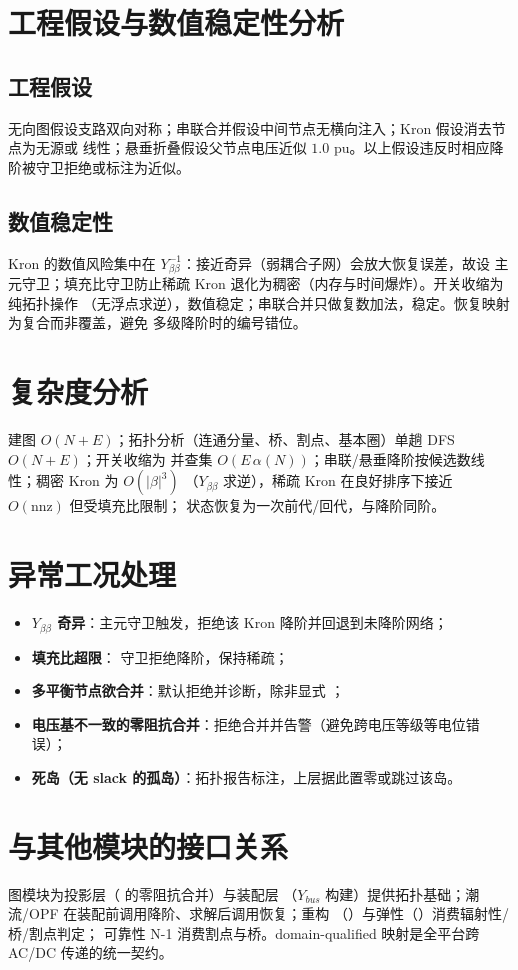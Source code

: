 \documentclass[UTF8,fontset=fandol,a4paper,11pt]{ctexart}
\begin{document}
\section{工程假设与数值稳定性分析}
\subsection{工程假设}
无向图假设支路双向对称；串联合并假设中间节点无横向注入；Kron 假设消去节点为无源或
线性；悬垂折叠假设父节点电压近似 $1.0$ pu。以上假设违反时相应降阶被守卫拒绝或标注为近似。

\subsection{数值稳定性}
Kron 的数值风险集中在 $Y_{\beta\beta}^{-1}$：接近奇异（弱耦合子网）会放大恢复误差，故设
主元守卫；填充比守卫防止稀疏 Kron 退化为稠密（内存与时间爆炸）。开关收缩为纯拓扑操作
（无浮点求逆），数值稳定；串联合并只做复数加法，稳定。恢复映射为复合而非覆盖，避免
多级降阶时的编号错位。

\section{复杂度分析}
建图 $O(N+E)$；拓扑分析（连通分量、桥、割点、基本圈）单趟 DFS $O(N+E)$；开关收缩为
并查集 $O(E\,\alpha(N))$；串联/悬垂降阶按候选数线性；稠密 Kron 为 $O(|\beta|^3)$
（$Y_{\beta\beta}$ 求逆），稀疏 Kron 在良好排序下接近 $O(\text{nnz})$ 但受填充比限制；
状态恢复为一次前代/回代，与降阶同阶。

\section{异常工况处理}
\begin{itemize}
  \item \textbf{$Y_{\beta\beta}$ 奇异}：主元守卫触发，拒绝该 Kron 降阶并回退到未降阶网络；
  \item \textbf{填充比超限}： 守卫拒绝降阶，保持稀疏；
  \item \textbf{多平衡节点欲合并}：默认拒绝并诊断，除非显式 ；
  \item \textbf{电压基不一致的零阻抗合并}：拒绝合并并告警（避免跨电压等级等电位错误）；
  \item \textbf{死岛（无 slack 的孤岛）}：拓扑报告标注，上层据此置零或跳过该岛。
\end{itemize}

\section{与其他模块的接口关系}
图模块为投影层（ 的零阻抗合并）与装配层
（$Y_{bus}$ 构建）提供拓扑基础；潮流/OPF 在装配前调用降阶、求解后调用恢复；重构
（）与弹性（）消费辐射性/桥/割点判定；
可靠性 N-1 消费割点与桥。domain-qualified 映射是全平台跨 AC/DC 传递的统一契约。
\end{document}
